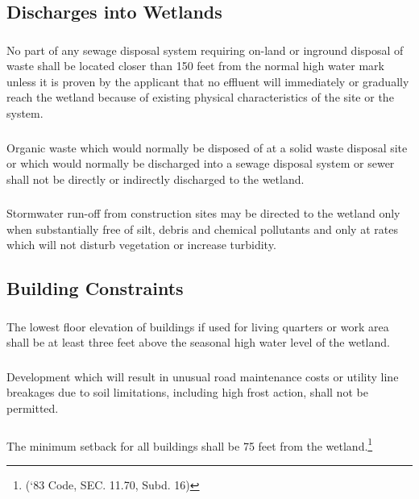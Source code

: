 \subsection{Discharges into Wetlands}
\subsubsection{}
No part of any sewage disposal system requiring on-land or inground disposal of waste shall be located closer than 150 feet from the normal high water mark unless it is proven by the applicant that no effluent will immediately or gradually reach the wetland because of existing physical characteristics of the site or the system.
\subsubsection{}
Organic waste which would normally be disposed of at a solid waste disposal site or which would normally be discharged into a sewage disposal system or sewer shall not be directly or indirectly discharged to the wetland.
\subsubsection{}
Stormwater run-off from construction sites may be directed to the wetland only when substantially free of silt, debris and chemical pollutants and only at rates which will not disturb vegetation or increase turbidity.
\subsection{Building Constraints}
\subsubsection{}
The lowest floor elevation of buildings if used for living quarters or work area shall be at least three feet above the seasonal high water level of the wetland.
\subsubsection{}
Development which will result in unusual road maintenance costs or utility line breakages due to soil limitations, including high frost action, shall not be permitted.
\subsubsection{}
The minimum setback for all buildings shall be 75 feet from the wetland.\footnote{(‘83 Code, SEC. 11.70, Subd. 16)}

